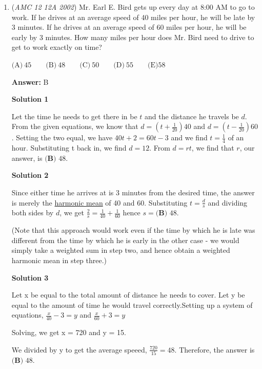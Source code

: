 \begin{enumerate}
 


	\item (\textit{AMC 12 12A 2002}) Mr. Earl E. Bird gets up every day at 8:00 AM to go to work. If he drives at an average speed of 40 miles per hour, he will be late by 3 minutes. If he drives at an average speed of 60 miles per hour, he will be early by 3 minutes. How many miles per hour does Mr. Bird need to drive to get to work exactly on time?


 $\text{(A)}\ 45 \qquad \text{(B)}\ 48 \qquad \text{(C)}\ 50 \qquad \text{(D)}\ 55 \qquad \text{(E)} 58$

 \textbf{Answer: }B



\textbf{Solution 1}

Let the time he needs to get there in be $t$ and the distance he travels be $d$. From the given equations, we know that $d=\left(t+\frac{1}{20}\right)40$ and $d=\left(t-\frac{1}{20}\right)60$. Setting the two equal, we have $40t+2=60t-3$ and we find $t=\frac{1}{4}$ of an hour. Substituting t back in, we find $d=12$. From $d=rt$, we find that $r$, our answer, is $\boxed{\textbf{(B) }48 }$.

 



\textbf{Solution 2}

Since either time he arrives at is $3$ minutes from the desired time, the answer is merely the \href{https://artofproblemsolving.com/wiki/index.php?title=Harmonic\_mean}{harmonic mean} of 40 and 60. Substituting $t=\frac ds$ and dividing both sides by $d$, we get $\frac 2s = \frac 1{40} + \frac 1{60}$ hence $s=\boxed{\textbf{(B) }48}$.

 (Note that this approach would work even if the time by which he is late was different from the time by which he is early in the other case - we would simply take a weighted sum in step two, and hence obtain a weighted harmonic mean in step three.)

 



\textbf{Solution 3}

Let x be equal to the total amount of distance he needs to cover. Let y be equal to the amount of time he would travel correctly.Setting up a system of equations, $\frac x{40} -3 = y$ and $\frac x{60} +3 = y$

 Solving, we get x = 720 and y = 15. 

 We divided by y to get the average speeed, $\frac {720}{15} = 48$. Therefore, the answer is $\boxed{\textbf{(B) }48}$.


\end{enumerate}
